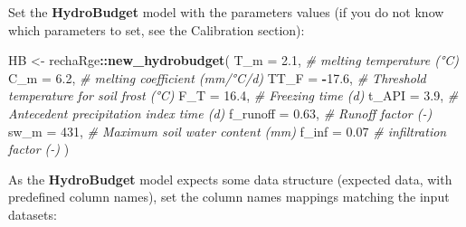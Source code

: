 \documentclass[
]{book}
\newenvironment{Shaded}{\begin{snugshade}}{\end{snugshade}}
\newcommand{\AttributeTok}[1]{\textcolor[rgb]{0.13,0.29,0.53}{#1}}
\newcommand{\CommentTok}[1]{\textcolor[rgb]{0.56,0.35,0.01}{\textit{#1}}}
\newcommand{\DecValTok}[1]{\textcolor[rgb]{0.00,0.00,0.81}{#1}}
\newcommand{\FloatTok}[1]{\textcolor[rgb]{0.00,0.00,0.81}{#1}}
\newcommand{\FunctionTok}[1]{\textcolor[rgb]{0.13,0.29,0.53}{\textbf{#1}}}
\newcommand{\NormalTok}[1]{#1}
\newcommand{\OtherTok}[1]{\textcolor[rgb]{0.56,0.35,0.01}{#1}}
\newcommand{\SpecialCharTok}[1]{\textcolor[rgb]{0.81,0.36,0.00}{\textbf{#1}}}
\newcommand{\StringTok}[1]{\textcolor[rgb]{0.31,0.60,0.02}{#1}}
\begin{document}
Set the \textbf{HydroBudget} model with the parameters values (if you do not know which parameters to set, see the Calibration section):

\begin{Shaded}
\begin{Highlighting}[]
\NormalTok{HB }\OtherTok{\textless{}{-}}\NormalTok{ rechaRge}\SpecialCharTok{::}\FunctionTok{new\_hydrobudget}\NormalTok{(}
  \AttributeTok{T\_m =} \FloatTok{2.1}\NormalTok{, }\CommentTok{\# melting temperature (°C)}
  \AttributeTok{C\_m =} \FloatTok{6.2}\NormalTok{, }\CommentTok{\# melting coefficient (mm/°C/d)}
  \AttributeTok{TT\_F =} \SpecialCharTok{{-}}\FloatTok{17.6}\NormalTok{, }\CommentTok{\# Threshold temperature for soil frost (°C)}
  \AttributeTok{F\_T =} \FloatTok{16.4}\NormalTok{, }\CommentTok{\# Freezing time (d)}
  \AttributeTok{t\_API =} \FloatTok{3.9}\NormalTok{, }\CommentTok{\# Antecedent precipitation index time (d)}
  \AttributeTok{f\_runoff =} \FloatTok{0.63}\NormalTok{, }\CommentTok{\# Runoff factor ({-})}
  \AttributeTok{sw\_m =} \DecValTok{431}\NormalTok{, }\CommentTok{\# Maximum soil water content (mm)}
  \AttributeTok{f\_inf =} \FloatTok{0.07} \CommentTok{\# infiltration factor ({-})}
\NormalTok{)}
\end{Highlighting}
\end{Shaded}

As the \textbf{HydroBudget} model expects some data structure (expected data, with predefined column names), set the column names mappings matching the input datasets:

\begin{Shaded}
\end{Shaded}
\end{document}
